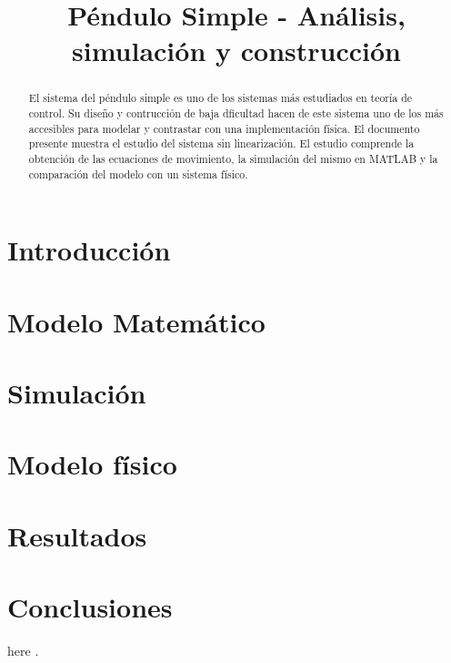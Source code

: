\documentclass[journal, onecolumn]{IEEEtran}
\begin{document}
\title{
Péndulo Simple - Análisis, simulación y construcción\\
}


\author{
}

\maketitle

\begin{abstract}

El sistema del péndulo simple es uno de los sistemas más estudiados
en teoría de control. 
Su diseño y contrucción de baja dficultad hacen de este sistema uno de
los más accesibles para modelar y contrastar con una implementación
física.
El documento presente muestra el estudio del sistema sin linearización.
El estudio comprende la obtención de las ecuaciones de movimiento,
la simulación del mismo en MATLAB y la comparación del modelo con
un sistema físico.


\end{abstract}


\section{Introducción}


\section{Modelo Matemático}


\section{Simulación}


\section{Modelo físico}


\section{Resultados}


\section{Conclusiones}


here \cite{susskind}.



\end{document}
